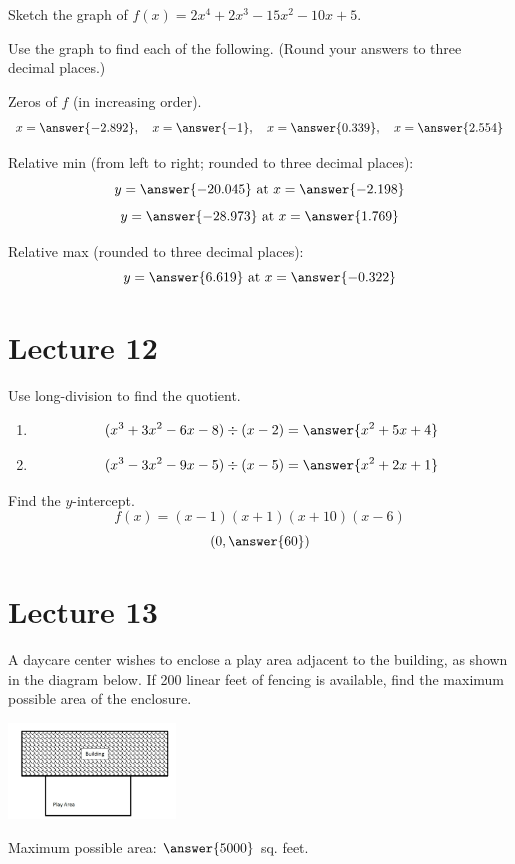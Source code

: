 \documentclass{ximera}
\begin{document}
  \begin{problem}\label{prob:160hom5prob6} 
  Sketch the graph of $f(x)=2x^4+2x^3-15x^2-10x+5$.
  \begin{center}  
\end{center}
  Use the graph to find each of the following.  (Round your answers to three decimal places.)
  
  Zeros of $f$ (in increasing order).
  $$x=\answer{-2.892},\quad x=\answer{-1},\quad x=\answer{0.339},\quad x=\answer{2.554}$$
  
  Relative min (from left to right; rounded to three decimal places):
  $$y=\answer{-20.045} \mbox{ at } x=\answer{-2.198}$$
  $$y=\answer{-28.973}\mbox{ at } x=\answer{1.769}$$
  
  Relative max (rounded to three decimal places):
  $$y=\answer{6.619}\mbox{ at } x=\answer{-0.322}$$
    \end{problem}
    
\section{Lecture 12}   
\begin{problem}\label{prob:160hom5prob4} Use long-division to find the quotient.
\begin{enumerate}
  \item $$(x^3+3x^2-6x-8)\div (x-2)=\answer{x^2+5x+4}$$
  \item $$(x^3-3x^2-9x-5)\div (x-5)=\answer{x^2+2x+1}$$
  \end{enumerate}
  \end{problem}    
 
 \begin{problem}\label{prob:160hom5prob7}
 Find the $y$-intercept.
 $$f(x)=(x-1)(x+1)(x+10)(x-6)$$
 $$(0,\answer{60})$$
 \end{problem}
 
  \section{Lecture 13}
 
  \begin{problem}\label{prob:160hom6prob1} 
 A daycare center wishes to enclose a play area adjacent to the building, as shown in the diagram below.  If 200 linear feet of fencing is available, find the maximum possible area of the enclosure. 
 \begin{image}
   \includegraphics[height=1in]{160H6pic1.jpg}
 \end{image}
 Maximum possible area: $\answer{5000}$ sq. feet.
 \end{problem}
 
\end{document}
